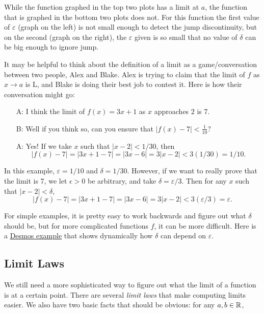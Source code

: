 While the function graphed in the top two plots has a limit at $a$, the function that is graphed in the bottom two plots does not. For this function the first value of $\varepsilon$ (graph on the left) is not small enough to detect the jump discontinuity, but on the second (graph on the right), the $\varepsilon$ given is so small that no value of $\delta$ can be big enough to ignore jump.

It may be helpful to think about the definition of a limit as a game/conversation between two people, Alex and Blake. Alex is trying to claim that the limit of $f$ as $x\to a$ is L, and Blake is doing their best job to contest it. Here is how their conversation might go:
\begin{itemize}
\item[A:] I think the limit of $f(x)=3x+1$ as $x$ approaches $2$ is 7.
\item[B:] Well if you think so, can you ensure that $|f(x)-7|<\frac{1}{10}$?
\item[A:] Yes! If we take $x$ such that $|x-2|<1/30$, then
$$|f(x)-7|=|3x + 1 - 7| = |3x-6| = 3|x-2| < 3(1/30) = 1/10.$$
\end{itemize}
In this example, $\varepsilon = 1/10$ and $\delta = 1/30$. However, if we want to really prove that the limit is 7, we let $\epsilon>0$ be arbitrary, and take $\delta = \varepsilon/3$. Then for any $x$ such that $|x-2|<\delta$,
$$|f(x)-7|=|3x + 1 - 7| = |3x-6| = 3|x-2| < 3(\varepsilon/3) = \varepsilon.$$

For simple examples, it is pretty easy to work backwards and figure out what $\delta$ should be, but for more complicated functions $f$, it can be more difficult. Here is a \href{https://www.desmos.com/calculator/cuoca85inx}{Desmos example} that shows dynamically how $\delta$ can depend on $\varepsilon$.


\subsection{Limit Laws}

We still need a more sophisticated way to figure out what the limit of a function is at a certain point. There are several \textit{limit laws} that make computing limits easier. We also have two basic facts that should be obvious: for any $a,b\in \mathbb{R}$,

